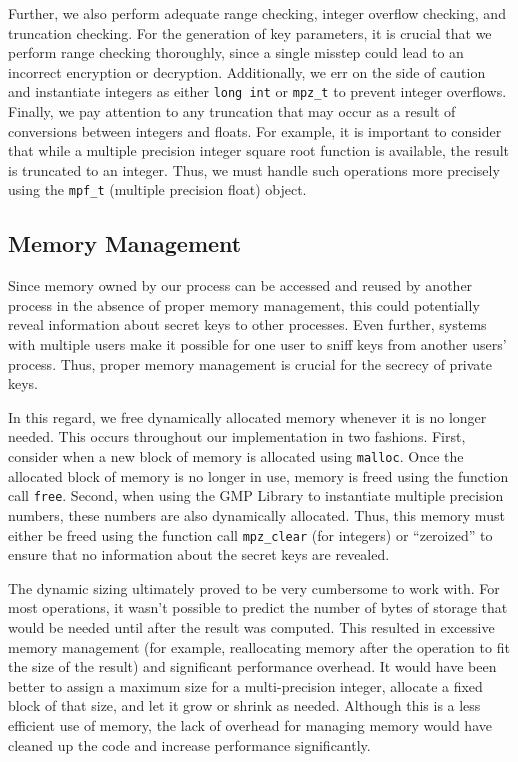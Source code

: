 \documentclass[a4paper]{article}
\begin{document}
Further, we also perform adequate range checking, integer overflow checking, and truncation checking. For the generation of key parameters, it is crucial that we perform range checking thoroughly, since a
single misstep could lead to an incorrect encryption or decryption. Additionally, we err on the side of caution and instantiate integers as either {\tt long int} or {\tt mpz\_t} to prevent integer overflows. Finally, we pay attention to any truncation that may occur as a result of conversions between integers and floats. For example, it is important to consider that while a multiple precision integer square root function is available, the result is
truncated to an integer. Thus, we must handle such operations more precisely using the {\tt mpf\_t} (multiple precision float) object.

\subsection{Memory Management}

Since memory owned by our process can be accessed and reused by another process in the absence of proper memory management, this could potentially reveal information about secret keys to other processes. Even further, systems with multiple users make it possible for one user to sniff keys from another users' process. Thus, proper memory management is crucial for the secrecy of private keys.

In this regard, we free dynamically allocated memory whenever it is no longer needed. This occurs throughout our implementation in two fashions. First, consider when a new block of memory is allocated using {\tt malloc}. Once the allocated block of memory is no longer in use, memory is freed using the function call {\tt free}. Second, when using the GMP Library to instantiate multiple precision numbers, these numbers are also dynamically allocated. Thus, this memory must
either be freed using the function call {\tt mpz\_clear} (for integers) or ``zeroized'' to ensure that no information about the secret keys are revealed.

The dynamic sizing ultimately proved to be very cumbersome to work with. For most operations, it wasn't possible to predict the number of bytes of storage that would be needed until after the result was computed. This resulted in excessive memory management (for example, reallocating memory after the operation to fit the size of the result) and significant performance overhead. It would have been better to assign a maximum size for a multi-precision integer, allocate a fixed block of that size, and let it grow or shrink as needed. Although this is a less efficient use of memory, the lack of overhead for managing memory would have cleaned up the code and increase performance significantly.
\end{document}
